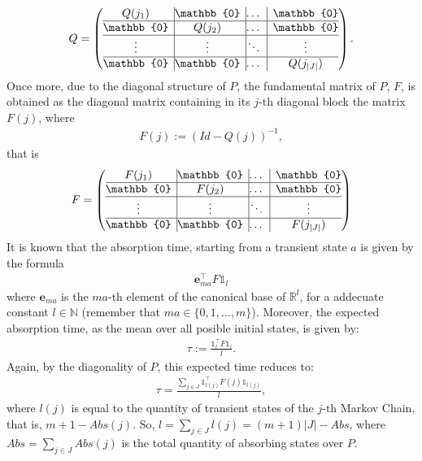 \documentclass{article}
\newcommand{\e}{\mathbf{e}}
\begin{document}
\begin{align*}
	Q =
	\left( \begin{array}{@{}c|@{}c|@{}c|c@{}}
		Q(j_1) & \mathbb{0} & \dots & \mathbb{0}\\
		\hline
		\mathbb{0} & Q(j_2) & \dots & \mathbb{0}\\
		\hline
		\vdots & \vdots & \ddots & \vdots\\
		\hline
		\mathbb{0} & \mathbb{0} & \dots & Q(j_{|J|})\\
	\end{array}	\right).
\end{align*}
Once more, due to the diagonal structure of $P$, the fundamental matrix of $P$, $F$, is obtained as the diagonal matrix containing in its $j$-th diagonal block the matrix $F(j)$, where
\begin{align*}
	F(j) := (Id - Q(j))^{-1},
\end{align*}
that is
\begin{align*}
	F =
	\left( \begin{array}{@{}c|@{}c|@{}c|c@{}}
		F(j_1) & \mathbb{0} & \dots & \mathbb{0}\\
		\hline
		\mathbb{0} & F(j_2) & \dots & \mathbb{0}\\
		\hline
		\vdots & \vdots & \ddots & \vdots\\
		\hline
		\mathbb{0} & \mathbb{0} & \dots & F(j_{|J|})\\
	\end{array}	\right)
\end{align*}
It is known that the absorption time, starting from a transient state $a$ is given by the formula
\begin{align*}
	\e_{ma}^{\top} F\mathbb{1}_l
\end{align*}
where $\e_{ma}$ is the $ma$-th element of the canonical base of $\mathbb{R}^l$, for a addecuate constant $l \in \mathds{N}$ (remember that $ma \in \{0, 1, \dots , m\}$). Moreover, the expected absorption time, as the mean over all posible initial states, is given by:
\begin{align*}
	\tau := \frac{\mathbb{1}_l^{\top}F \mathbb{1}_l}{l}.
\end{align*}
Again, by the diagonality of $P$, this expected time reduces to:
\begin{align*}
	\tau = \frac{\sum_{j \in J}\mathbb{1}_{l(j)}^{\top}F(j) \mathbb{1}_{l(j)}}{l},
\end{align*}
where $l(j)$ is equal to the quantity of transient states of the $j$-th Markov Chain, that is, $m+1 - Abs(j)$. So, $l = \sum\limits_{j \in J} l(j) = (m+1)|J|- Abs$, where $Abs = \sum\limits_{j \in J} Abs(j)$ is the total quantity of absorbing states over $P$.\par
\end{document}
